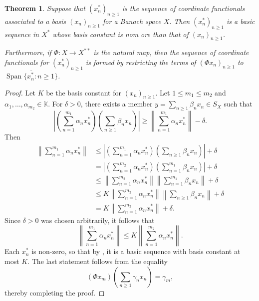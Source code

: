 \documentclass[11pt]{article}
\theoremstyle{thmstyle}
\newtheorem{theorem}{Theorem}[section]
\theoremstyle{defstyle}
\newcommand{\R}{\mathbb{R}}
\newcommand{\bbC}{\mathbb{C}}
\newcommand{\K}{\mathbb{K}} %
\newcommand{\Span}{\operatorname{Span}}
\renewcommand{\le}{\leqslant}
\renewcommand{\ge}{\geqslant}
\begin{document}
\begin{theorem}
	Suppose that $(x_n^\ast)_{n\ge 1}$ is the sequence of coordinate functionals associated to a basis $(x_n)_{n\ge 1}$ for a Banach space $X$. Then $(x_n^\ast)_{n\ge 1}$ is a basic sequence in $X^\ast$ whose basis constant is nom ore than that of $(x_n)_{n\ge 1}$.

	Furthermore, if $\Phi\colon X\to X^{\ast\ast}$ is the natural map, then the sequence of coordinate functionals for $(x_n^\ast)_{n\ge 1}$ is formed by restricting the terms of $\left(\Phi x_n\right)_{n\ge 1}$ to $\overline{\Span\{x_n^\ast\colon n\ge 1\}}$.
\end{theorem}
\begin{proof}
	Let $K$ be the basis constant for $(x_n)_{n\ge 1}$. Let $1\le m_1\le m_2$ and $\alpha_1,\dots,\alpha_{m_2}\in\K$. For $\delta > 0$, there exists a member $y = \displaystyle\sum_{n\ge 1} \beta_n x_n\in S_X$ such that 
	\begin{equation*}
		\left|\left(\sum_{n = 1}^{m_1}\alpha_n x_n^\ast\right)\left(\sum_{n\ge 1}\beta_n x_n\right)\right|\ge \left\|\sum_{n = 1}^{m_1}\alpha_n x_n^\ast\right\| - \delta.
	\end{equation*}
	Then 
	\begin{align*}
		\left\|\sum_{n = 1}^{m_1} \alpha_n x_n^\ast\right\| &\le\left|\left(\sum_{n = 1}^{m_1} \alpha_n x_n^\ast\right)\left(\sum_{n\ge 1} \beta_n x_n\right)\right| + \delta\\
		&= \left|\left(\sum_{n = 1}^{m_2}\alpha_n x_n^\ast\right)\left(\sum_{n = 1}^{m_1}\beta_n x_n\right)\right| + \delta\\
		&\le\left\|\sum_{n = 1}^{m_2}\alpha_n x_n^\ast\right\|\left\|\sum_{n = 1}^{m_1}\beta_n x_n\right\| + \delta\\
		&\le K\left\|\sum_{n = 1}^{m_2}\alpha_n x_n^\ast\right\|\left\|\sum_{n\ge 1} \beta_n x_n\right\| + \delta\\
		&= K\left\|\sum_{n = 1}^{m_2}\alpha_n x_n^\ast\right\| + \delta.
	\end{align*}
	Since $\delta > 0$ was chosen arbitrarily, it follows that 
	\begin{equation*}
		\left\|\sum_{n = 1}^{m_1}\alpha_n x_n^\ast\right\|\le K\left\|\sum_{n = 1}^{m_2}\alpha_n x_n^\ast\right\|.
	\end{equation*}
	Each $x_n^\ast$ is non-zero, so that by , it is a basic sequence with basis constant at most $K$. The last statement follows from the equality 
	\begin{equation*}
		\left(\Phi x_m\right)\left(\sum_{n\ge 1}\gamma_n x_n\right) = \gamma_m,
	\end{equation*}
	thereby completing the proof.
\end{proof}
\end{document}
